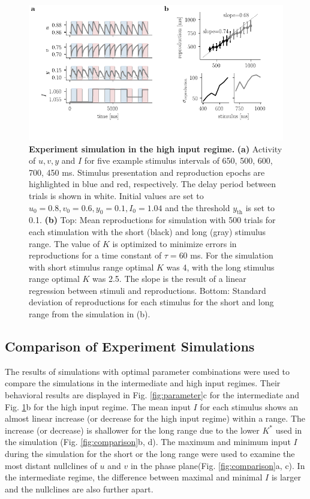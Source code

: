 \documentclass[10pt]{article}
\begin{document}
\begin{figure}[ht]
	\centering
	\includegraphics{figures/highI.pdf}
	\caption{\textbf{Experiment simulation in the high input regime.} 
	\textbf{(a)} Activity of $u, v, y$ and $I$ for five example stimulus intervals of 650, 500, 600, 700, 450 ms. Stimulus presentation and reproduction epochs are highlighted in blue and red, respectively. The delay period between trials is shown in white. Initial values are set to $u_0=0.8 , v_0=0.6 , y_0=0.1, I_0=1.04$ and the threshold $y_{\text{th}}$ is set to 0.1. 
	\textbf{(b)} Top: Mean reproductions for simulation with 500 trials for each stimulation with the short (black) and long (gray) stimulus range. The value of $K$ is optimized to minimize errors in reproductions for a time constant of $\tau = 60$ ms. For the simulation with short stimulus range optimal $K$ was 4, with the long stimulus range optimal $K$ was 2.5.
		The slope is the result of a linear regression between stimuli and reproductions.
		Bottom: Standard deviation of reproductions for each stimulus for the short and long range from the simulation in (b).
	}
\label{highI}
\end{figure}

\subsection{Comparison of Experiment Simulations}
The results of simulations with optimal parameter combinations were used to compare the simulations in the intermediate and high input regimes.
Their behavioral results are displayed in Fig. \ref{fig:parameter}c for the intermediate and Fig. \ref{highI}b for the high input regime.
The mean input $I$ for each stimulus shows an almost linear increase (or decrease for the high input regime) within a range. The increase (or decrease) is shallower for the long range due to the lower $K^*$ used in the simulation (Fig. \ref{fig:comparison}b, d).
The maximum and minimum input $I$ during the simulation for the short or the long range were used to examine the most distant nullclines of $u$ and $v$ in the phase plane(Fig. \ref{fig:comparison}a, c). 
In the intermediate regime, the difference between maximal and minimal $I$ is larger and the nullclines are also further apart.
\end{document}
